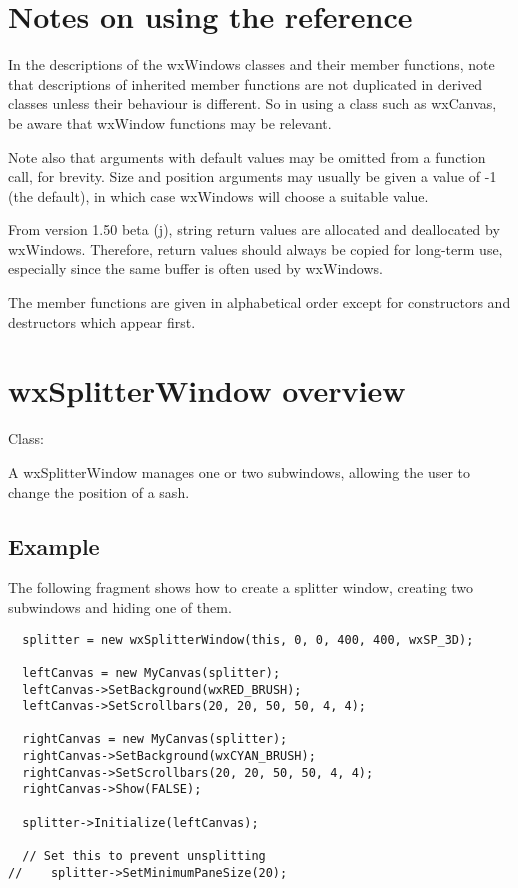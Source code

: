 \section{Notes on using the reference}\label{referencenotes}

In the descriptions of the wxWindows classes and their member
functions, note that descriptions of inherited member functions are not
duplicated in derived classes unless their behaviour is different. So in
using a class such as wxCanvas, be aware that wxWindow functions may be
relevant.

Note also that arguments with default values may be omitted from a
function call, for brevity. Size and position arguments may usually be
given a value of -1 (the default), in which case wxWindows will choose a
suitable value.

From version 1.50 beta (j), string return values are allocated and
deallocated by wxWindows. Therefore, return values should always be
copied for long-term use, especially since the same buffer is often
used by wxWindows.

The member functions are given in alphabetical order except for
constructors and destructors which appear first.

\section{wxSplitterWindow overview}\label{wxsplitterwndoverview}

Class: 

A wxSplitterWindow manages one or two subwindows, allowing the user to change the position
of a sash.

\subsection{Example}

The following fragment shows how to create a splitter window, creating two
subwindows and hiding one of them.

{\small
\begin{verbatim}
  splitter = new wxSplitterWindow(this, 0, 0, 400, 400, wxSP_3D);

  leftCanvas = new MyCanvas(splitter);
  leftCanvas->SetBackground(wxRED_BRUSH);
  leftCanvas->SetScrollbars(20, 20, 50, 50, 4, 4);

  rightCanvas = new MyCanvas(splitter);
  rightCanvas->SetBackground(wxCYAN_BRUSH);
  rightCanvas->SetScrollbars(20, 20, 50, 50, 4, 4);
  rightCanvas->Show(FALSE);

  splitter->Initialize(leftCanvas);

  // Set this to prevent unsplitting
//    splitter->SetMinimumPaneSize(20);
\end{verbatim}
}

